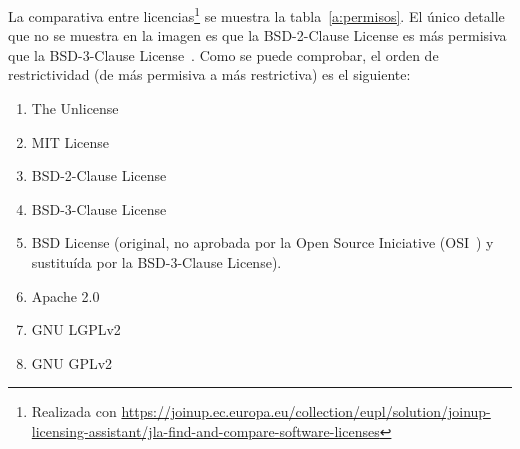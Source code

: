 La comparativa entre licencias\footnote{Realizada con \url{https://joinup.ec.europa.eu/collection/eupl/solution/joinup-licensing-assistant/jla-find-and-compare-software-licenses}} se muestra la tabla~\ref{a:permisos}. El único detalle que no se muestra en la imagen es que la BSD-2-Clause License es más permisiva que la BSD-3-Clause License~\cite{BSD}. Como se puede comprobar, el orden de restrictividad (de más permisiva a más restrictiva) es el siguiente:

\begin{enumerate}
	\item The Unlicense
	\item MIT License
	\item BSD-2-Clause License
	\item BSD-3-Clause License
	\item BSD License (original, no aprobada por la Open Source Iniciative (OSI~\cite{BSD}) y sustituída por la BSD-3-Clause License).
	\item Apache 2.0
	\item GNU LGPLv2
	\item GNU GPLv2
\end{enumerate}


